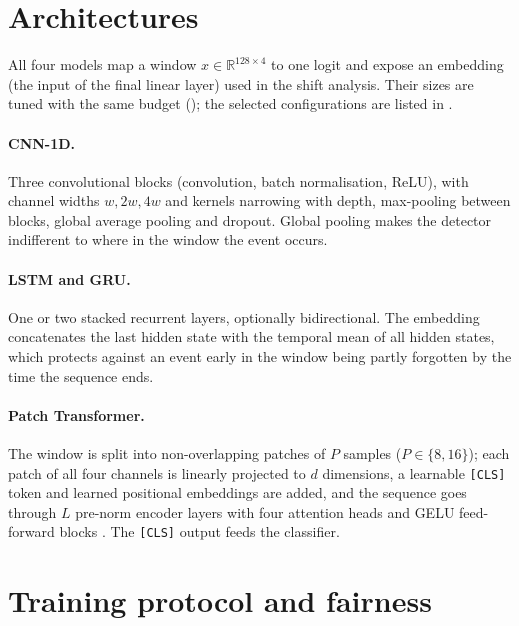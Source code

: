 \section{Architectures}
\label{sec:arch}

All four models map a window $x\in\mathbb{R}^{128\times 4}$ to one logit and expose an embedding
(the input of the final linear layer) used in the shift analysis. Their sizes are tuned with the
same budget (); the selected configurations are listed in .

\paragraph{CNN-1D.} Three convolutional blocks (convolution, batch normalisation, ReLU), with channel
widths $w,2w,4w$ and kernels narrowing with depth, max-pooling between blocks, global average pooling
and dropout. Global pooling makes the detector indifferent to where in the window the event occurs.

\paragraph{LSTM and GRU.} One or two stacked recurrent layers, optionally bidirectional. The
embedding concatenates the last hidden state with the temporal mean of all hidden states, which
protects against an event early in the window being partly forgotten by the time the sequence ends.

\paragraph{Patch Transformer.} The window is split into non-overlapping patches of $P$ samples
($P\in\{8,16\}$); each patch of all four channels is linearly projected to $d$ dimensions, a learnable
\texttt{[CLS]} token and learned positional embeddings are added, and the sequence goes through $L$
pre-norm encoder layers with four attention heads and GELU feed-forward blocks
\parencite{vaswani2017attention,nie2023patchtst}. The \texttt{[CLS]} output feeds the classifier.

\section{Training protocol and fairness}
\label{sec:training}

